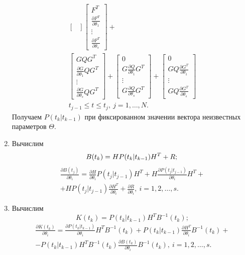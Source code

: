 \documentclass[a4paper,14pt]{extarticle}
\newcommand{\pd}[2]{\frac{\partial #1}{\partial #2}}
\newcommand{\inv}[1]{#1^{-1}}
\begin{document}
\begin{enumerate}
\begin{gather*}
\begin{bmatrix}
	\end{bmatrix}
	\begin{bmatrix}
		F^T \\
		\pd{F^T}{\theta_1} \\
		\vdots \\
		\pd{F^T}{\theta_s}
	\end{bmatrix} + \\
	\begin{bmatrix}
		G Q G^T \\
		\pd{G}{\theta_1} Q G^T \\
		\vdots \\
		\pd{G}{\theta_s} Q G^T 
	\end{bmatrix} +
	\begin{bmatrix}
		0 \\
		G \pd{Q}{\theta_1} G^T \\
		\vdots \\
		G \pd{Q}{\theta_s} G^T
	\end{bmatrix} +
	\begin{bmatrix}
		0 \\
		G Q \pd{G^T}{\theta_1} \\
		\vdots \\
		G Q \pd{G^T}{\theta_s}
	\end{bmatrix}
	\\ t_{j-1} \le t \le t_j,\ j = 1,\ldots,N.
\end{gather*}
Получаем $P(t_k|t_{k-1})$ при фиксированном значении вектора неизвестных
параметров $\Theta$.

\item Вычислим
\[
	B(t_k) = H P(t_k|t_{k-1}) H^T + R; \\
\]
\begin{multline*}
	\pd{B(t_j)}{\theta_i} = \pd{H}{\theta_i} P(t_j|t_{j-1}) H^T + H
	\pd{P(t_j|t_{j-1})}{\theta_i} H^T + \\ + H P(t_j|t_{j-1}) \pd{H^T}{\theta_i} +
	\pd{R}{\theta_i},\ i = 1, 2, \ldots, s.
\end{multline*}

\item Вычислим
\[
	K(t_k) = P(t_k|t_{k-1}) H^T \inv{B}(t_k);
\]
\begin{multline*}
	\pd{K(t_k)}{\theta_i} = \pd{P(t_k|t_{k-1})}{\theta_i} H^T \inv{B}(t_k) +
		P(t_k|t_{k-1}) \pd{H^T}{\theta_i} \inv{B}(t_k) + \\ - P(t_k|t_{k-1}) H^T
		\inv{B}(t_k) \pd{B(t_k)}{\theta_i} \inv{B}(t_k),\ i = 1, 2, \ldots, s.
\end{multline*}


\end{enumerate}
\end{document}
